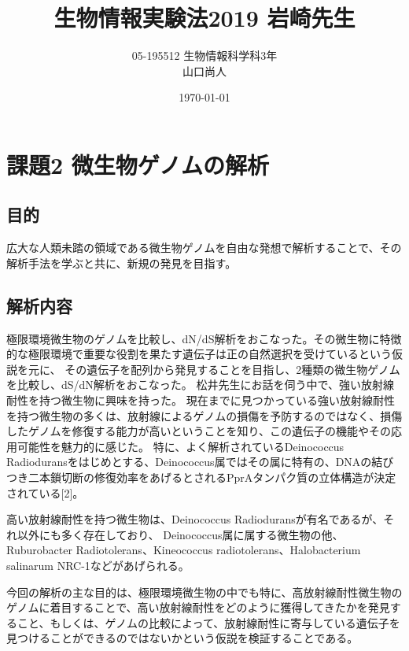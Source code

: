 \documentclass[a4j,12pt]{jreport}
\title{生物情報実験法2019 岩崎先生}
\author{05-195512 生物情報科学科3年 \\ 山口尚人}
\date{\today}
\begin{document}
\maketitle




\chapter{課題2 微生物ゲノムの解析}

\section{目的}
広大な人類未踏の領域である微生物ゲノムを自由な発想で解析することで、その解析手法を学ぶと共に、新規の発見を目指す。

\section{解析内容}
極限環境微生物のゲノムを比較し、dN/dS解析をおこなった。その微生物に特徴的な極限環境で重要な役割を果たす遺伝子は正の自然選択を受けているという仮説を元に、
その遺伝子を配列から発見することを目指し、2種類の微生物ゲノムを比較し、dS/dN解析をおこなった。
松井先生にお話を伺う中で、強い放射線耐性を持つ微生物に興味を持った。
現在までに見つかっている強い放射線耐性を持つ微生物の多くは、放射線によるゲノムの損傷を予防するのではなく、損傷したゲノムを修復する能力が高いということを知り、この遺伝子の機能やその応用可能性を魅力的に感じた。
特に、よく解析されているDeinococcus Radioduransをはじめとする、Deinococcus属ではその属に特有の、DNAの結びつき二本鎖切断の修復効率をあげるとされるPprAタンパク質の立体構造が決定されている[2]。

高い放射線耐性を持つ微生物は、Deinococcus Radioduransが有名であるが、それ以外にも多く存在しており、
Deinococcus属に属する微生物の他、Ruburobacter Radiotolerans、Kineococcus radiotolerans、Halobacterium salinarum NRC-1などがあげられる。

今回の解析の主な目的は、極限環境微生物の中でも特に、高放射線耐性微生物のゲノムに着目することで、高い放射線耐性をどのように獲得してきたかを発見すること、もしくは、ゲノムの比較によって、放射線耐性に寄与している遺伝子を見つけることができるのではないかという仮説を検証することである。
\end{document}
